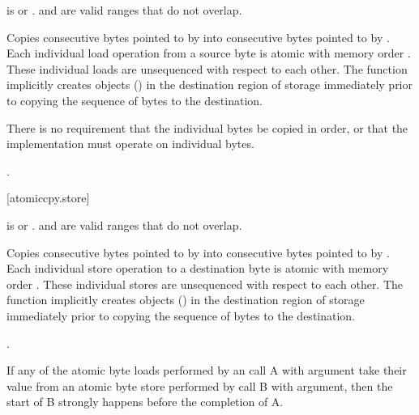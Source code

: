 \begin{itemdescr}
\pnum
\expects

 is  or
. \tcode{(char*)dest + [0, count)}
and \tcode{(const char*)source + [0, count)} are valid ranges
that do not overlap.

\pnum
\effects
Copies  consecutive bytes pointed to by
 into consecutive bytes pointed to by . Each
individual load operation from a source byte is atomic with memory order
. These individual loads are unsequenced with respect to
each other. The function implicitly creates objects ()
in the destination region of storage immediately prior to copying the
sequence of bytes to the destination. 
\begin{note} There is no requirement
that the individual bytes be copied in order, or that the implementation
must operate on individual bytes. \end{note}

\pnum
\returns
{}.
\end{itemdescr}

[atomiccpy.store]{}
\textbf{}

\begin{itemdescr}
\pnum
\expects
{} is  or
. \tcode{(char*)dest + [0, count)}
and \tcode{(const char*)source + [0, count)} are valid ranges
that do not overlap.

\pnum
\effects
Copies  consecutive bytes pointed to by
 into consecutive bytes pointed to by . Each
individual store operation to a destination byte is atomic with memory
order . These individual stores are unsequenced with
respect to each other. The function implicitly creates objects
() in the destination region of storage immediately
prior to copying the sequence of bytes to the destination.

\pnum
\returns

.
\end{itemdescr}

\begin{note} If any of the atomic byte loads performed by an
 call A with
 argument take their value from an atomic
byte store performed by  call
B with  argument, then the start of B
strongly happens before the completion of A. 
\end{note}  
